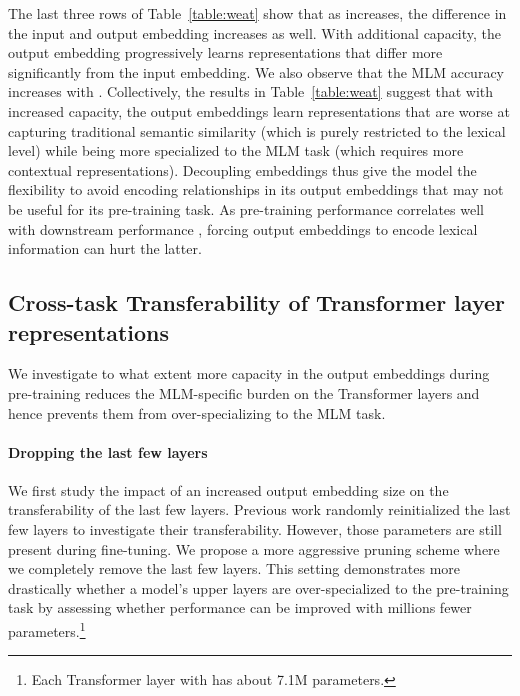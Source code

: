 \documentclass{article} \usepackage{iclr2021_conference,times}
\begin{document}
The last three rows of Table~\ref{table:weat} show that as  increases, the difference in the input and output embedding increases as well. With additional capacity, the output embedding progressively learns representations that differ more significantly from the input embedding. We also observe that the MLM accuracy increases with . Collectively, the results in Table~\ref{table:weat} suggest that with increased capacity, the output embeddings learn representations that are worse at capturing traditional semantic similarity (which is purely restricted to the lexical level) while being more specialized to the MLM task (which requires more contextual representations). Decoupling embeddings thus give the model the flexibility to avoid encoding relationships in its output embeddings that may not be useful for its pre-training task.  As pre-training performance correlates well with downstream performance \citep{Devlin2019}, forcing output embeddings to encode lexical information can hurt the latter.











\subsection{Cross-task Transferability of Transformer layer representations}  \label{sec:transferability}



We investigate to what extent more capacity in the output embeddings during pre-training reduces the MLM-specific burden on the Transformer layers and hence prevents them from over-specializing to the MLM task.









\paragraph{Dropping the last few layers} We first study the impact of an increased output embedding size on the transferability of the last few layers. Previous work \citep{Zhang2020,Tamkin2020} randomly reinitialized the last few layers to investigate their transferability. However, those parameters are still present during fine-tuning. We propose a more aggressive pruning scheme where we completely remove the last few layers. This setting demonstrates more drastically whether a model's upper layers are over-specialized to the pre-training task by assessing whether performance can be improved with millions fewer parameters.\footnote{Each Transformer layer with  has about 7.1M parameters.}
\end{document}
